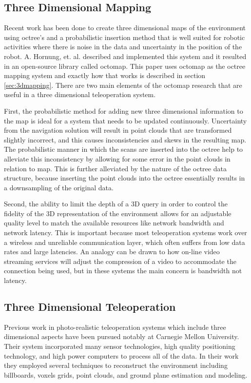 \documentclass[journal]{IEEEtran}
\begin{document}
  \subsection{Three Dimensional Mapping}
  \label{sec:previouswork_3dmapping}
  Recent work has been done to create three dimensional maps of the
  environment using octree's and a probabilistic insertion method that is well
  suited for robotic activities where there is noise in the data and
  uncertainty in the position of the robot. A. Hornung, et. al. described and
  implemented this system and it resulted in an open-source library called
  octomap.\cite{octomap} This paper uses octomap as the octree mapping system
  and exactly how that works is described in section \ref{sec:3dmapping}.
  There are two main elements of the octomap research that are useful in a
  three dimensional teleoperation system.
  
  First, the probabilistic method for adding new three dimensional information
  to the map is ideal for a system that needs to be updated continuously.
  Uncertainty from the navigation solution will result in point clouds that 
  are transformed slightly incorrect, and this causes inconsistencies and 
  skews in the resulting map. The probabilistic manner in which the scans are 
  inserted into the octree help to alleviate this inconsistency by allowing 
  for some error in the point clouds in relation to map. This is further 
  alleviated by the nature of the octree data structure, because inserting the 
  point clouds into the octree essentially results in a downsampling of the 
  original data.
  
  Second, the ability to limit the depth of a 3D query in order to control the 
  fidelity of the 3D representation of the environment allows for an 
  adjustable quality level to match the available resources like network 
  bandwidth and network latency.  This is important because most teleoperation 
  systems work over a wireless and unreliable communication layer, which often 
  suffers from low data rates and large latencies.  An analogy can be drawn to 
  how on-line video streaming services will adjust the compression of a video 
  to accommodate the connection being used, but in these systems the main 
  concern is bandwidth not latency.
  
  \subsection{Three Dimensional Teleoperation}
  Previous work in photo-realistic teleoperation systems which include three
  dimensional aspects have been pursued notably at Carnegie Mellon
  University.\cite{5457431} Their system incorporated many sensor
  technologies, high quality positioning technology, and high power computers
  to process all of the data. In their work they employed several techniques
  to reconstruct the environment including billboards, voxels grids, point
  clouds, and ground plane estimation and modeling.
  
\end{document}
